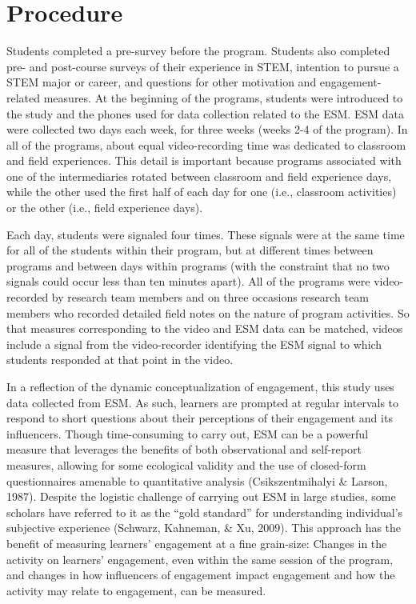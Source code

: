\documentclass[]{msu-thesis}
\theoremstyle{definition}
\theoremstyle{definition}
\theoremstyle{definition}
\theoremstyle{remark}
\begin{document}
\section{Procedure}\label{procedure}

Students completed a pre-survey before the program. Students also
completed pre- and post-course surveys of their experience in STEM,
intention to pursue a STEM major or career, and questions for other
motivation and engagement-related measures. At the beginning of the
programs, students were introduced to the study and the phones used for
data collection related to the ESM. ESM data were collected two days
each week, for three weeks (weeks 2-4 of the program). In all of the
programs, about equal video-recording time was dedicated to classroom
and field experiences. This detail is important because programs
associated with one of the intermediaries rotated between classroom and
field experience days, while the other used the first half of each day
for one (i.e., classroom activities) or the other (i.e., field
experience days).

Each day, students were signaled four times. These signals were at the
same time for all of the students within their program, but at different
times between programs and between days within programs (with the
constraint that no two signals could occur less than ten minutes apart).
All of the programs were video-recorded by research team members and on
three occasions research team members who recorded detailed field notes
on the nature of program activities. So that measures corresponding to
the video and ESM data can be matched, videos include a signal from the
video-recorder identifying the ESM signal to which students responded at
that point in the video.

In a reflection of the dynamic conceptualization of engagement, this
study uses data collected from ESM. As such, learners are prompted at
regular intervals to respond to short questions about their perceptions
of their engagement and its influencers. Though time-consuming to carry
out, ESM can be a powerful measure that leverages the benefits of both
observational and self-report measures, allowing for some ecological
validity and the use of closed-form questionnaires amenable to
quantitative analysis (Csikszentmihalyi \& Larson, 1987). Despite the
logistic challenge of carrying out ESM in large studies, some scholars
have referred to it as the ``gold standard'' for understanding
individual's subjective experience (Schwarz, Kahneman, \& Xu, 2009).
This approach has the benefit of measuring learners' engagement at a
fine grain-size: Changes in the activity on learners' engagement, even
within the same session of the program, and changes in how influencers
of engagement impact engagement and how the activity may relate to
engagement, can be measured.
\end{document}
